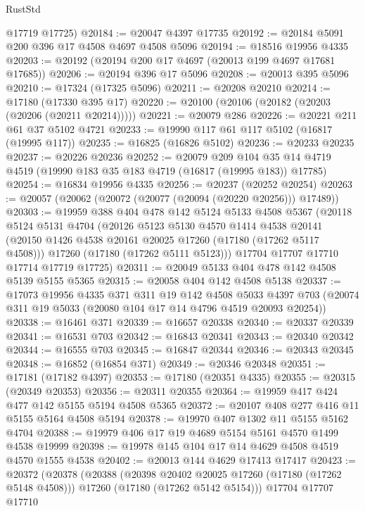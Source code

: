 \begin{lexlean}{RustStd}
\begin{coremodule}
{\begin{coremodule}
{{{{{{{{{{{{{{{{{{{{{{{{{{{{{{{{{{{{{{{{{{{{{{{{{{{{{{{      @17719
      @17725)
@20184 := @20047 @4397 @17735
@20192 := @20184 @5091 @200 @396 @17 @4508 @4697 @4508 @5096
@20194 := @18516 @19956 @4335
@20203 := @20192 (@20194 @200 @17 @4697 (@20013 @199 @4697 @17681 @17685))
@20206 := @20194 @396 @17 @5096
@20208 := @20013 @395 @5096
@20210 := @17324 (@17325 @5096)
@20211 := @20208 @20210
@20214 := @17180 (@17330 @395 @17)
@20220 := @20100 (@20106 (@20182 (@20203 (@20206 (@20211 @20214)))))
@20221 := @20079 @286
@20226 := @20221 @211 @61 @37 @5102 @4721
@20233 := @19990 @117 @61 @117 @5102 (@16817 (@19995 @117))
@20235 := @16825 (@16826 @5102)
@20236 := @20233 @20235
@20237 := @20226 @20236
@20252 := @20079
    @209
    @104
    @35
    @14
    @4719
    @4519
    (@19990 @183 @35 @183 @4719 (@16817 (@19995 @183)) @17785)
@20254 := @16834 @19956 @4335
@20256 := @20237 (@20252 @20254)
@20263 := @20057 (@20062 (@20072 (@20077 (@20094 (@20220 @20256))) @17489))
@20303 := @19959
    @388
    @404
    @478
    @142
    @5124
    @5133
    @4508
    @5367
    (@20118
      @5124
      @5131
      @4704
      (@20126
        @5123
        @5130
        @4570
        @1414
        @4538
        @20141
        (@20150 @1426 @4538 @20161 @20025 @17260 (@17180 (@17262 @5117 @4508)))
        @17260
        (@17180 (@17262 @5111 @5123)))
      @17704
      @17707
      @17710
      @17714
      @17719
      @17725)
@20311 := @20049 @5133 @404 @478 @142 @4508 @5139 @5155 @5365
@20315 := @20058 @404 @142 @4508 @5138
@20337 := @17073
    @19956
    @4335
    @371
    @311
    @19
    @142
    @4508
    @5033
    @4397
    @703
    (@20074 @311 @19 @5033 (@20080 @104 @17 @14 @4796 @4519 @20093 @20254))
@20338 := @16461 @371
@20339 := @16657 @20338
@20340 := @20337 @20339
@20341 := @16531 @703
@20342 := @16843 @20341
@20343 := @20340 @20342
@20344 := @16555 @703
@20345 := @16847 @20344
@20346 := @20343 @20345
@20348 := @16852 (@16854 @371)
@20349 := @20346 @20348
@20351 := @17181 (@17182 @4397)
@20353 := @17180 (@20351 @4335)
@20355 := @20315 (@20349 @20353)
@20356 := @20311 @20355
@20364 := @19959 @417 @424 @477 @142 @5155 @5194 @4508 @5365
@20372 := @20107 @408 @277 @416 @11 @5155 @5164 @4508 @5194
@20378 := @19970 @407 @1302 @11 @5155 @5162 @4704
@20388 := @19979 @406 @17 @19 @4689 @5154 @5161 @4570 @1499 @4538 @19999
@20398 := @19978 @145 @104 @17 @14 @4629 @4508 @4519 @4570 @1555 @4538
@20402 := @20013 @144 @4629 @17413 @17417
@20423 := @20372
    (@20378
      (@20388
        (@20398 @20402 @20025 @17260 (@17180 (@17262 @5148 @4508)))
        @17260
        (@17180 (@17262 @5142 @5154)))
      @17704
      @17707
      @17710
}}}}}}}}}}}}}}}}}}}}}}}}}}}}}}}}}}}}}}}}}}}}}}}}}}}}}}}
\end{coremodule}}
\end{coremodule}
\end{lexlean}
